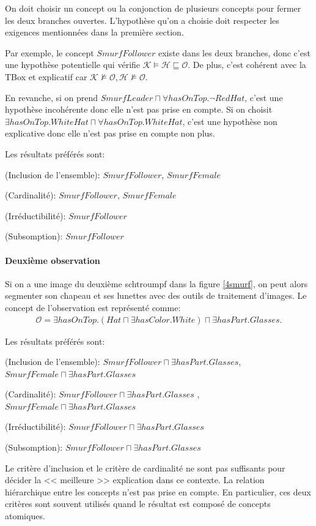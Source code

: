 \documentclass{article}
\begin{document}
On doit choisir un concept ou la conjonction de plusieurs concepts pour fermer les deux branches ouvertes. L'hypothèse qu'on a choisie doit 
respecter les exigences mentionnées dans la première section.

Par exemple, le concept $SmurfFollower$ existe dans les deux branches, donc c'est une hypothèse potentielle qui vérifie $\mathcal{K}\vDash \mathcal{H} \sqsubseteq \mathcal{O}$.
De plus, c'est cohérent avec la TBox et explicatif car $\mathcal{K} \nvDash \mathcal{O}, \mathcal{H}   \nvDash \mathcal{O}$.

En revanche, si on prend $SmurfLeader \sqcap \forall hasOnTop. \neg RedHat$, c'est une hypothèse incohérente donc elle n'est pas prise en compte. 
Si on choisit $\exists hasOnTop.WhiteHat \sqcap \forall  hasOnTop.WhiteHat$, c'est une hypothèse non explicative donc elle n'est pas prise en compte non plus.

Les résultats préférés sont:

(Inclusion de l'ensemble): $SmurfFollower$, $SmurfFemale$

(Cardinalité): $SmurfFollower$, $SmurfFemale$

(Irréductibilité): $SmurfFollower$

(Subsomption): $SmurfFollower$
\paragraph*{Deuxième observation}

Si on a une image du deuxième schtroumpf dans  la figure \ref{4smurf}, on peut alors segmenter son chapeau et ses lunettes avec des outils de traitement d'images.
Le concept de l'observation est représenté comme:
\begin{align*}
\mathcal{O}= \exists hasOnTop.(Hat \sqcap \exists hasColor.White) \sqcap \exists hasPart.Glasses.
\end{align*}

 Les résultats préférés sont:
 
(Inclusion de l'ensemble): $SmurfFollower \sqcap \exists hasPart.Glasses$, $SmurfFemale \sqcap \exists hasPart.Glasses$

(Cardinalité): $ SmurfFollower \sqcap \exists hasPart.Glasses$ , $ SmurfFemale \sqcap \exists hasPart.Glasses$

(Irréductibilité): $ SmurfFollower \sqcap \exists hasPart.Glasses$

(Subsomption): $SmurfFollower \sqcap \exists hasPart.Glasses$

Le critère d'inclusion et le critère de cardinalité ne sont pas suffisants pour décider la << meilleure >> explication dans ce contexte.
La relation hiérarchique entre les concepts n'est pas prise en compte.
En particulier, ces deux critères sont souvent utilisés quand le résultat est composé de concepts atomiques.
\end{document}
